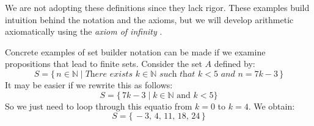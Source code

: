        We are not adopting these definitions since they lack rigor. These
        examples build intuition behind the notation and the axioms, but we will
        develop arithmetic axiomatically using the \textit{axiom of infinity}%
        .
        \begin{example}
            Concrete examples of set builder notation can be made if we examine
            propositions that lead to finite sets. Consider the set $A$ defined
            by:
            \begin{equation}
                S=\{\,n\in\mathbb{N}\;|\;\textit{There exists }k\in\mathbb{N}
                    \textit{ such that }k<5\textit{ and }n=7k-3\,\}
            \end{equation}
            It may be easier if we rewrite this as follows:
            \begin{equation}
                S=\{\,7k-3\;|\;k\in\mathbb{N}\textrm{ and }k<5\}
            \end{equation}
            So we just need to loop through this equatio from $k=0$ to $k=4$.
            We obtain:
            \begin{equation}
                S=\{\,\minus{3},\,4,\,11,\,18,\,24\,\}
            \end{equation}
        \end{example}
